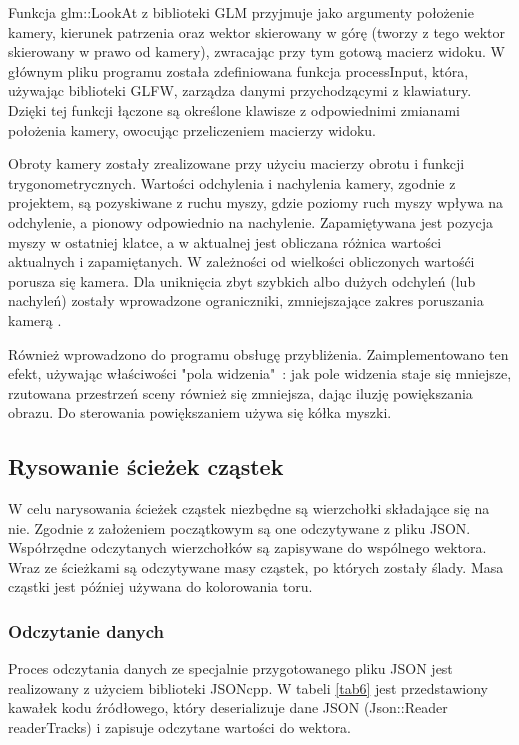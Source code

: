 Funkcja glm::LookAt z biblioteki GLM przyjmuje jako argumenty położenie kamery, kierunek patrzenia oraz wektor skierowany w górę (tworzy z tego wektor skierowany w prawo od kamery), zwracając przy tym gotową macierz widoku. W głównym pliku programu została zdefiniowana funkcja processInput, która, używając biblioteki GLFW, zarządza danymi przychodzącymi z klawiatury. Dzięki tej funkcji łączone są określone klawisze z odpowiednimi zmianami położenia kamery, owocując przeliczeniem macierzy widoku.

Obroty kamery zostały zrealizowane przy użyciu macierzy obrotu i funkcji trygonometrycznych. Wartości odchylenia i nachylenia kamery, zgodnie z projektem, są pozyskiwane z ruchu myszy, gdzie poziomy ruch myszy wpływa na odchylenie, a pionowy odpowiednio na nachylenie. Zapamiętywana jest pozycja myszy w ostatniej klatce, a w aktualnej jest obliczana różnica wartości aktualnych i zapamiętanych. W zależności od wielkości obliczonych wartośći porusza się kamera. Dla uniknięcia zbyt szybkich albo dużych odchyleń (lub nachyleń) zostały wprowadzone ograniczniki, zmniejszające zakres poruszania kamerą \cite{learnopengl}. 

Również wprowadzono do programu obsługę przybliżenia. Zaimplementowano ten efekt, używając właściwości "pola widzenia"\ : jak pole widzenia staje się mniejsze, rzutowana przestrzeń sceny również się zmniejsza, dając iluzję powiększania obrazu. Do sterowania powiększaniem używa się kółka myszki.

\subsection{Rysowanie ścieżek cząstek}
W celu narysowania ścieżek cząstek niezbędne są wierzchołki składające się na nie. Zgodnie z założeniem początkowym są one odczytywane z pliku JSON. Współrzędne odczytanych wierzchołków są zapisywane do wspólnego wektora. Wraz ze ścieżkami są odczytywane masy cząstek, po których zostały ślady. Masa cząstki jest później używana do kolorowania toru.

\subsubsection{Odczytanie danych}
Proces odczytania danych ze specjalnie przygotowanego pliku JSON jest realizowany z użyciem biblioteki JSONcpp. W tabeli \ref{tab6} jest przedstawiony kawałek kodu źródłowego, który deserializuje dane JSON (Json::Reader readerTracks) i zapisuje odczytane wartości do wektora. 

